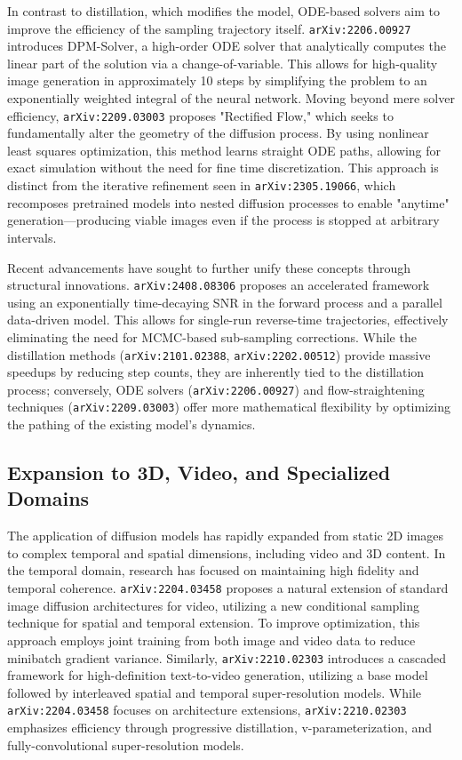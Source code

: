 \documentclass[11pt]{article}
\begin{document}
In contrast to distillation, which modifies the model, ODE-based solvers aim to improve the efficiency of the sampling trajectory itself. \texttt{arXiv:2206.00927} introduces DPM-Solver, a high-order ODE solver that analytically computes the linear part of the solution via a change-of-variable. This allows for high-quality image generation in approximately 10 steps by simplifying the problem to an exponentially weighted integral of the neural network. Moving beyond mere solver efficiency, \texttt{arXiv:2209.03003} proposes "Rectified Flow," which seeks to fundamentally alter the geometry of the diffusion process. By using nonlinear least squares optimization, this method learns straight ODE paths, allowing for exact simulation without the need for fine time discretization. This approach is distinct from the iterative refinement seen in \texttt{arXiv:2305.19066}, which recomposes pretrained models into nested diffusion processes to enable "anytime" generation—producing viable images even if the process is stopped at arbitrary intervals.

Recent advancements have sought to further unify these concepts through structural innovations. \texttt{arXiv:2408.08306} proposes an accelerated framework using an exponentially time-decaying SNR in the forward process and a parallel data-driven model. This allows for single-run reverse-time trajectories, effectively eliminating the need for MCMC-based sub-sampling corrections. While the distillation methods (\texttt{arXiv:2101.02388}, \texttt{arXiv:2202.00512}) provide massive speedups by reducing step counts, they are inherently tied to the distillation process; conversely, ODE solvers (\texttt{arXiv:2206.00927}) and flow-straightening techniques (\texttt{arXiv:2209.03003}) offer more mathematical flexibility by optimizing the pathing of the existing model's dynamics.

\subsection{Expansion to 3D, Video, and Specialized Domains}

The application of diffusion models has rapidly expanded from static 2D images to complex temporal and spatial dimensions, including video and 3D content. In the temporal domain, research has focused on maintaining high fidelity and temporal coherence. \texttt{arXiv:2204.03458} proposes a natural extension of standard image diffusion architectures for video, utilizing a new conditional sampling technique for spatial and temporal extension. To improve optimization, this approach employs joint training from both image and video data to reduce minibatch gradient variance. Similarly, \texttt{arXiv:2210.02303} introduces a cascaded framework for high-definition text-to-video generation, utilizing a base model followed by interleaved spatial and temporal super-resolution models. While \texttt{arXiv:2204.03458} focuses on architecture extensions, \texttt{arXiv:2210.02303} emphasizes efficiency through progressive distillation, v-parameterization, and fully-convolutional super-resolution models.
\end{document}
